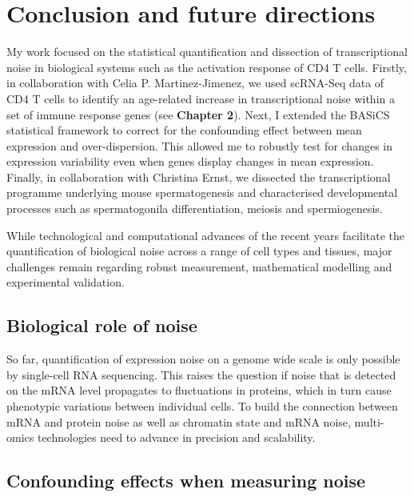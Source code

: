 
\chapter{Conclusion and future directions}  

\vspace{-5mm}

My work focused on the statistical quantification and dissection of transcriptional noise in biological systems such as the activation response of CD4\plus{} T cells. Firstly, in collaboration with Celia P. Martinez-Jimenez, we used scRNA-Seq data of CD4\plus{} T cells to identify an age-related increase in transcriptional noise within a set of immune response genes (see \textbf{Chapter 2}). Next, I extended the BASiCS statistical framework to correct for the confounding effect between mean expression and over-dispersion. This allowed me to robustly test for changes in expression variability even when genes display changes in mean expression. Finally, in collaboration with Christina Ernst, we dissected the transcriptional programme underlying mouse spermatogenesis and characterised developmental processes such as spermatogonila differentiation, meiosis and spermiogenesis. 

 
While technological and computational advances of the recent years facilitate the quantification of biological noise across a range of cell types and tissues, major challenges remain regarding robust measurement, mathematical modelling and experimental validation. 

\section{Biological role of noise}

So far, quantification of expression noise on a genome wide scale is only possible by single-cell RNA sequencing. This raises the question if noise that is detected on the mRNA level propagates to fluctuations in proteins, which in turn cause phenotypic variations between individual cells. To build the connection between mRNA and protein noise as well as chromatin state and mRNA noise, multi-omics technologies need to advance in precision and scalability.

\section{Confounding effects when measuring noise}

